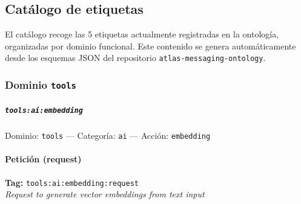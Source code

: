 

\subsection{Catálogo de etiquetas}
\label{sec:ontologia-catalogo}

El catálogo recoge las 5 etiquetas actualmente registradas en la ontología, organizadas por dominio funcional. Este contenido se genera automáticamente desde los esquemas JSON del repositorio \texttt{atlas-messaging-ontology}.

\subsubsection{Dominio \texttt{tools}}
\label{sec:ontologia-dominio-tools}

\subparagraph{\texttt{tools:ai:embedding}}
\label{sec:tag-tools-ai-embedding}

Dominio: \texttt{tools} — Categoría: \texttt{ai} — Acción: \texttt{embedding}

\paragraph{Petición (request)}

\textbf{Tag:} \texttt{tools:ai:embedding:request}\\
\textit{Request to generate vector embeddings from text input}

